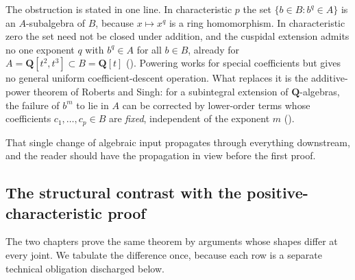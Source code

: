 The obstruction is stated in one line.  In characteristic $p$ the set
$\{b\in B:b^q\in A\}$ is an $A$-subalgebra of $B$, because
$x\mapsto x^q$ is a ring homomorphism.  In characteristic zero the set
need not be closed under addition, and the cuspidal extension admits no
one exponent $q$ with
$b^q\in A$ for all $b\in B$, already for
$A=\mathbf Q[t^2,t^3]\subset B=\mathbf Q[t]$
().  Powering works for special coefficients but gives no general uniform
coefficient-descent operation.  What replaces it is the additive-power theorem of
Roberts and Singh: for a subintegral extension of $\mathbf Q$-algebras,
the failure of $b^m$ to lie in $A$ can be corrected by lower-order terms
whose coefficients $c_1,\ldots,c_p\in B$ are \emph{fixed}, independent of
the exponent $m$ ().

That single change of algebraic input propagates through everything
downstream, and the reader should have the propagation in view before the
first proof.

\subsection{The structural contrast with the positive-characteristic proof}
\label{sec:ch44-contrast}

The two chapters prove the same theorem by arguments whose shapes differ at
every joint.  We tabulate the difference once, because each row is a
separate technical obligation discharged below.

